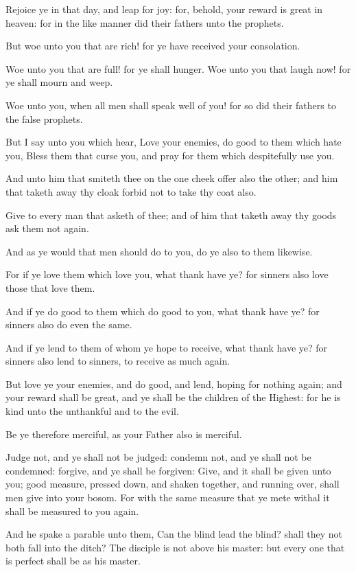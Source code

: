 \Verse Rejoice ye in that day, and leap for joy: for, behold, your reward is great in heaven: for in the like manner did their fathers unto the prophets.

\Verse But woe unto you that are rich! for ye have received your consolation.

\Verse Woe unto you that are full! for ye shall hunger. Woe unto you that laugh now! for ye shall mourn and weep.

\Verse Woe unto you, when all men shall speak well of you! for so did their fathers to the false prophets.

\Verse But I say unto you which hear, Love your enemies, do good to them which hate you, \Verse Bless them that curse you, and pray for them which despitefully use you.

\Verse And unto him that smiteth thee on the one cheek offer also the other; and him that taketh away thy cloak forbid not to take thy coat also.

\Verse Give to every man that asketh of thee; and of him that taketh away thy goods ask them not again.

\Verse And as ye would that men should do to you, do ye also to them likewise.

\Verse For if ye love them which love you, what thank have ye? for sinners also love those that love them.

\Verse And if ye do good to them which do good to you, what thank have ye?  for sinners also do even the same.

\Verse And if ye lend to them of whom ye hope to receive, what thank have ye? for sinners also lend to sinners, to receive as much again.

\Verse But love ye your enemies, and do good, and lend, hoping for nothing again; and your reward shall be great, and ye shall be the children of the Highest: for he is kind unto the unthankful and to the evil.

\Verse Be ye therefore merciful, as your Father also is merciful.

\Verse Judge not, and ye shall not be judged: condemn not, and ye shall not be condemned: forgive, and ye shall be forgiven: \Verse Give, and it shall be given unto you; good measure, pressed down, and shaken together, and running over, shall men give into your bosom. For with the same measure that ye mete withal it shall be measured to you again.

\Verse And he spake a parable unto them, Can the blind lead the blind?  shall they not both fall into the ditch?  \Verse The disciple is not above his master: but every one that is perfect shall be as his master.

